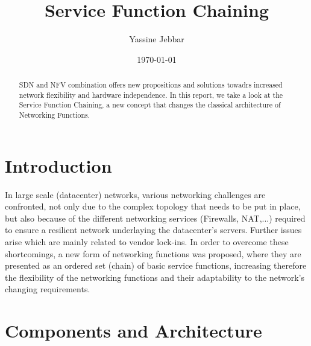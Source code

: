\documentclass[a4paper]{article}
\title{Service Function Chaining}
\author{Yassine Jebbar}
\date{\today}
\begin{document}
\maketitle

\begin{abstract}
SDN and NFV combination offers new propositions and solutions towadrs increased network flexibility and hardware independence. In this report, we take a look at the Service Function Chaining, a new concept that changes the classical architecture of Networking Functions.
\end{abstract}

\section{Introduction}

In large scale (datacenter) networks, various networking challenges are confronted, not only due to the complex topology that needs to be put in place, but also because of the different networking services (Firewalls, NAT,...) required to ensure a resilient network underlaying the datacenter's servers.
Further issues arise which are mainly related to vendor lock-ins. In order to overcome these shortcomings, a new form of networking functions was proposed, where they are presented as an ordered set (chain) of basic service functions, increasing therefore the flexibility of the networking functions and their adaptability to the network's changing requirements.

\section{Components and Architecture}
\end{document}
